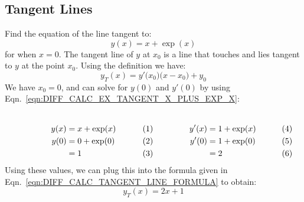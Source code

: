 \documentclass[crop=false,class=book,oneside]{standalone}
\begin{document}
        \subsection{Tangent Lines}
            \begin{lexample}
                Find the equation of the line tangent to:
                \begin{equation}
                    \label{eqn:DIFF_CALC_EX_TANGENT_X_PLUS_EXP_X}
                    y(x)=x+\exp(x)
                \end{equation}
                for when $x=0$.
                The tangent line of $y$ at $x_{0}$
                is a line that touches
                and lies tangent to $y$ at the point $x_{0}$. Using the
                definition we have:
                \begin{equation}
                    \label{eqn:DIFF_CALC_TANGENT_LINE_FORMULA}
                    y_{T}(x)
                    =y'\big(x_{0}\big)\big(x-x_{0}\big)+y_{0}
                \end{equation}
                We have $x_{0}=0$, and can solve for $y(0)$ and $y'(0)$
                by using
                Eqn.~\ref{eqn:DIFF_CALC_EX_TANGENT_X_PLUS_EXP_X}:
                \par
                \begin{subequations}
                    \begin{minipage}[b]{0.49\textwidth}
                        \begin{align}
                            y(x)&=x+\exp(x)\\
                            y(0)&=0+\exp(0)\\
                            &=1
                        \end{align}
                    \end{minipage}
                    \hfill
                    \begin{minipage}[b]{0.49\textwidth}
                        \begin{align}
                            y'(x)&=1+\exp(x)\\
                            y'(0)&=1+\exp(0)\\
                            &=2
                        \end{align}
                    \end{minipage}
                \end{subequations}
                Using these values, we can plug this into the formula
                given in Eqn.~\ref{eqn:DIFF_CALC_TANGENT_LINE_FORMULA}
                to obtain:
                \begin{equation}
                    y_{T}(x)=2x+1
                \end{equation}
            \end{lexample}
\end{document}
